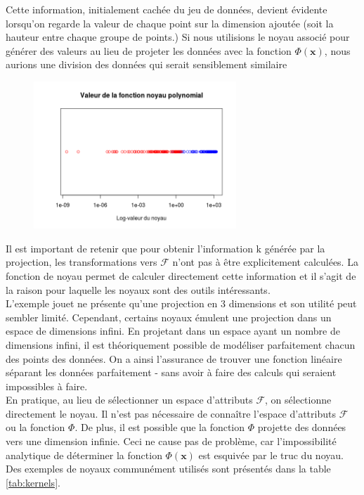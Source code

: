Cette information, initialement cachée du jeu de données, devient évidente lorsqu'on regarde la valeur de chaque point sur la dimension ajoutée (soit la hauteur entre chaque groupe de points.)
Si nous utilisions le noyau associé pour générer des valeurs au lieu de projeter les données avec la fonction $\Phi(\textbf{x})$,
nous aurions une division des données qui serait sensiblement similaire \\ 

\begin{figure}[H]
	\centering
	\includegraphics[width=3in]{exemple_2_kernel}
\end{figure}


Il est important de retenir que pour obtenir l’information $\textrm{k}$ générée par la projection, les transformations vers $\mathcal{F}$ n'ont pas à être explicitement calculées. 
La fonction de noyau permet de calculer directement cette information et il s’agit de la raison pour laquelle les noyaux sont des outils intéressants. \\

L'exemple jouet ne présente qu’une projection en 3 dimensions et son utilité peut sembler limité. Cependant, certains noyaux émulent une projection dans un espace de dimensions infini. 
En projetant dans un espace ayant un nombre de dimensions infini, il est théoriquement possible de modéliser 
parfaitement chacun des points des données. On a ainsi l’assurance de trouver une fonction linéaire séparant les 
données parfaitement - sans avoir à faire des calculs qui seraient impossibles à faire.\\

En pratique, au lieu de sélectionner un espace d'attributs $\mathcal{F}$, on sélectionne directement le noyau. 
Il n'est pas nécessaire de connaître l'espace d'attributs $\mathcal{F}$ ou la fonction $\Phi$. De plus, 
il est possible que la fonction $\Phi$ projette des données vers une dimension infinie. Ceci ne cause pas de problème, car 
l'impossibilité analytique de déterminer la fonction $\Phi(\textbf{x})$ est esquivée par 
le truc du noyau. Des exemples de noyaux communément utilisés sont présentés dans la table \ref{tab:kernels}.

